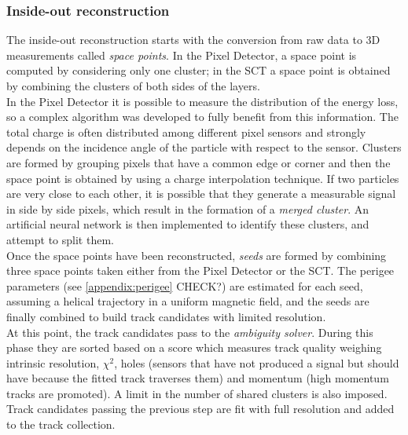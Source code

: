 \documentclass[a4paper,twoside,12pt]{article}
\begin{document}
\subsubsection*{Inside-out reconstruction}
The inside-out reconstruction starts with the conversion from raw data to 3D measurements called \textit{space points}. In the Pixel Detector, a space point is computed by
considering only one cluster; in the SCT a space point
is obtained by combining the clusters of both sides of the layers.  \\

In the Pixel Detector it is
possible to measure the distribution of the energy loss, so a complex algorithm was developed
to fully benefit from this information.  
The total charge is often distributed among different pixel sensors and strongly depends on the 
incidence angle of the particle with respect to the sensor. Clusters are formed by grouping 
pixels that have a common edge or corner and then the space point is obtained by using a 
charge interpolation technique. If two particles are very close to each other, it is possible
that they generate a measurable signal in side by side pixels, which result in the formation of
a \textit{merged cluster}. An artificial neural network is then implemented to identify these clusters, and attempt to split them.\\

Once the space points have been reconstructed, \textit{seeds} are formed by combining three space points taken either from the Pixel Detector or the SCT. The perigee parameters (see \ref{appendix:perigee} CHECK?) are estimated for each seed, assuming a helical trajectory in a 
uniform magnetic field, and the seeds are finally combined to build track candidates with limited resolution.\\

At this point, the track candidates pass to the \textit{ambiguity solver}. During this
phase they are sorted based on a score which measures track quality
weighing intrinsic resolution, $\chi^2$, holes (sensors that have not produced a signal but 
should have because the fitted track traverses them) and momentum (high momentum tracks are 
promoted). A limit in the number of shared clusters is also imposed. \\

Track candidates passing the previous step are fit with full resolution and added to the track collection.
\end{document}
